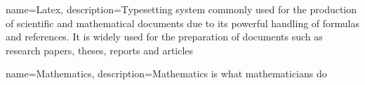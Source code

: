 
{
    name=Latex,
    description={Typesetting system commonly used for the production of scientific and mathematical documents due to its powerful handling of formulas and references. It is widely used for the preparation of documents such as research papers, theses, reports and articles}
}

{
    name=Mathematics,
    description={Mathematics is what mathematicians do}
}